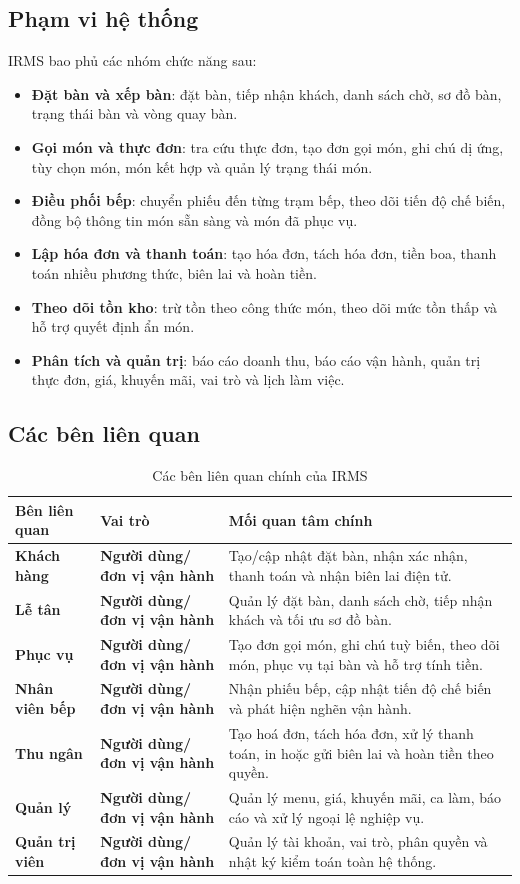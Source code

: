 \documentclass[11pt,a4paper]{article}
\begin{document}
\subsection{Phạm vi hệ thống}
IRMS bao phủ các nhóm chức năng sau:
\begin{itemize}
  \item \textbf{Đặt bàn và xếp bàn}: đặt bàn, tiếp nhận khách, danh sách chờ, sơ đồ bàn, trạng thái bàn và vòng quay bàn.
  \item \textbf{Gọi món và thực đơn}: tra cứu thực đơn, tạo đơn gọi món, ghi chú dị ứng, tùy chọn món, món kết hợp và quản lý trạng thái món.
  \item \textbf{Điều phối bếp}: chuyển phiếu đến từng trạm bếp, theo dõi tiến độ chế biến, đồng bộ thông tin món sẵn sàng và món đã phục vụ.
  \item \textbf{Lập hóa đơn và thanh toán}: tạo hóa đơn, tách hóa đơn, tiền boa, thanh toán nhiều phương thức, biên lai và hoàn tiền.
  \item \textbf{Theo dõi tồn kho}: trừ tồn theo công thức món, theo dõi mức tồn thấp và hỗ trợ quyết định ẩn món.
  \item \textbf{Phân tích và quản trị}: báo cáo doanh thu, báo cáo vận hành, quản trị thực đơn, giá, khuyến mãi, vai trò và lịch làm việc.
\end{itemize}

\subsection{Các bên liên quan}
\begin{table}[H]
\centering
\caption{Các bên liên quan chính của IRMS}
\begin{tabularx}{\textwidth}{>{\bfseries}p{2.4cm} >{\bfseries}p{2.8cm} X}
\toprule
Bên liên quan & Vai trò & Mối quan tâm chính \\
\midrule
Khách hàng & Người dùng/đơn vị vận hành & Tạo/cập nhật đặt bàn, nhận xác nhận, thanh toán và nhận biên lai điện tử. \\
Lễ tân & Người dùng/đơn vị vận hành & Quản lý đặt bàn, danh sách chờ, tiếp nhận khách và tối ưu sơ đồ bàn. \\
Phục vụ & Người dùng/đơn vị vận hành & Tạo đơn gọi món, ghi chú tuỳ biến, theo dõi món, phục vụ tại bàn và hỗ trợ tính tiền. \\
Nhân viên bếp & Người dùng/đơn vị vận hành & Nhận phiếu bếp, cập nhật tiến độ chế biến và phát hiện nghẽn vận hành. \\
Thu ngân & Người dùng/đơn vị vận hành & Tạo hoá đơn, tách hóa đơn, xử lý thanh toán, in hoặc gửi biên lai và hoàn tiền theo quyền. \\
Quản lý & Người dùng/đơn vị vận hành & Quản lý menu, giá, khuyến mãi, ca làm, báo cáo và xử lý ngoại lệ nghiệp vụ. \\
Quản trị viên & Người dùng/đơn vị vận hành & Quản lý tài khoản, vai trò, phân quyền và nhật ký kiểm toán toàn hệ thống. \\
\bottomrule
\end{tabularx}
\end{table}
\end{document}
